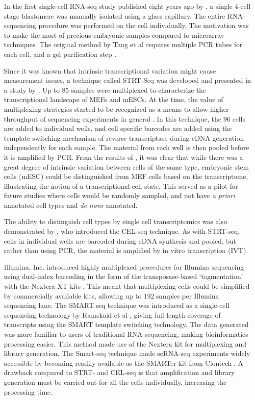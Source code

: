 In the first single-cell RNA-seq study published eight years ago by \citet{Tang2009-af}, a single 4-cell stage blastomere was manually isolated using a glass capillary. The entire RNA-sequencing procedure was performed on the cell individually. The motivation was to make the most of precious embryonic samples compared to microarray techniques. The original method by Tang et al requires multiple PCR tubes for each cell, and a gel purification step \cite{Sasagawa2013-ps, Tang2010-am}.

Since it was known that intrinsic transcriptional variation might cause measurement issues, a technique called STRT-Seq was developed and presented in a study by \citet{Islam2011-yy}. Up to 85 samples were multiplexed to characterize the transcriptional landscape of MEFs and mESCs. At the time, the value of multiplexing strategies started to be recognized as a means to allow higher throughput of sequencing experiments in general \cite{Kozarewa2011-we}. In this technique, the 96 cells are added to individual wells, and cell specific barcodes are added using the template-switching mechanism of reverse transcriptase during cDNA generation independently for each sample. The material from each well is then pooled before it is amplified by PCR. From the results of \citet{Islam2011-yy}, it was clear that while there was a great degree of intrinsic variation between cells of the same type, embryonic stem cells (mESC) could be distinguished from MEF cells based on the transcriptome, illustrating the notion of a transcriptional cell state. This served as a pilot for future studies where cells would be randomly sampled, and not have \textit{a priori} annotated cell types and \textit{de novo} annotated.

The ability to distinguish cell types by single cell transcriptomics was also demonstrated by \cite{Hashimshony2012-am}, who introduced the CEL-seq technique. As with STRT-seq, cells in individual wells are barcoded during cDNA synthesis and pooled, but rather than using PCR, the material is amplified by in vitro transcription (IVT).

Illumina, Inc. introduced highly multiplexed procedures for Illumina sequencing using dual-index barcoding in the form of the transposase-based ‘tagmentation’ with the Nextera XT kits \cite{Illumina_Inc2012-mf}. This meant that multiplexing cells could be simplified by commercially available kits, allowing up to 192 samples per Illumina sequencing lane. The SMART-seq technique was introduced as a single-cell sequencing technology by Ramskold et al \cite{Ramskold2012-zc}, giving full length coverage of transcripts using the SMART template switching technology. The data generated was more familiar to users of traditional RNA-sequencing, making bioinformatics processing easier. This method made use of the Nextera kit for multiplexing and library generation. The Smart-seq technique made scRNA-seq experiments widely accessible by becoming readily available as the SMARTer kit from Clontech \cite{Clontech_Laboratories_Inc2013-zf}. A drawback compared to STRT- and CEL-seq is that amplification and library generation must be carried out for all the cells individually, increasing the processing time.


